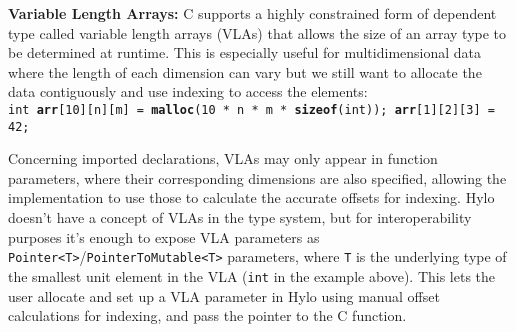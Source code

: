 \textbf{Variable Length Arrays:}
C supports a highly constrained form of dependent type called variable length arrays (VLAs) that allows the size of an array type to be determined at runtime. This is especially useful for multidimensional data\cite{vla-reddit} where the length of each dimension can vary but we still want to allocate the data contiguously and use indexing to access the elements: \\
\texttt{int \textbf{arr}[10][n][m] = \textbf{malloc}(10 * n * m * \textbf{sizeof}(int)); \space\space\space   \textbf{arr}[1][2][3] = 42;}

Concerning imported declarations, VLAs may only appear in function parameters, where their corresponding dimensions are also specified, allowing the implementation to use those to calculate the accurate offsets for indexing. Hylo doesn't have a concept of VLAs in the type system, but for interoperability purposes it's enough to expose VLA parameters as \texttt{Pointer<T>}/\texttt{PointerToMutable<T>} parameters, where \texttt{T} is the underlying type of the smallest unit element in the VLA (\texttt{int} in the example above). This lets the user allocate and set up a VLA parameter in Hylo using manual offset calculations for indexing, and pass the pointer to the C function.
